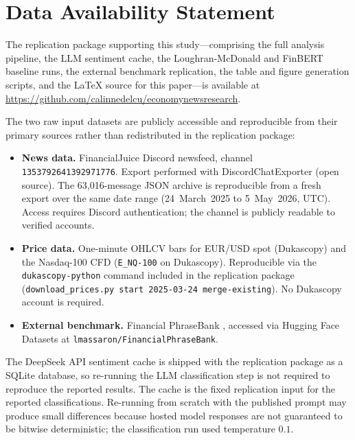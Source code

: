 \section*{Data Availability Statement}

The replication package supporting this study---comprising the full
analysis pipeline, the LLM sentiment cache, the Loughran-McDonald and
FinBERT baseline runs, the external benchmark replication, the table
and figure generation scripts, and the LaTeX source for this paper---is
available at
\url{https://github.com/calinnedelcu/economynewsresearch}.

The two raw input datasets are publicly accessible and reproducible
from their primary sources rather than redistributed in the
replication package:

\begin{itemize}[leftmargin=*, itemsep=2pt]
\item \textbf{News data.} FinancialJuice Discord newsfeed, channel
\texttt{1353792641392971776}. Export performed with
DiscordChatExporter (open source). The 63{,}016-message JSON archive
is reproducible from a fresh export over the same date range
(24~March~2025 to 5~May~2026, UTC). Access requires Discord
authentication; the channel is publicly readable to verified accounts.

\item \textbf{Price data.} One-minute OHLCV bars for EUR/USD spot
(Dukascopy) and the Nasdaq-100 CFD (\texttt{E\_NQ-100} on Dukascopy).
Reproducible via the \texttt{dukascopy-python} command included in
the replication package (\texttt{download\_prices.py
\textendash\textendash start 2025-03-24 \textendash\textendash
merge-existing}). No Dukascopy account is required.

\item \textbf{External benchmark.} Financial PhraseBank
\citep{malo2014good}, accessed via Hugging Face Datasets at
\texttt{lmassaron/FinancialPhraseBank}.
\end{itemize}

The DeepSeek API sentiment cache is shipped with the replication
package as a SQLite database, so re-running the LLM classification
step is not required to reproduce the reported results. The cache is
the fixed replication input for the reported classifications.
Re-running from scratch with the published prompt may produce small
differences because hosted model responses are not guaranteed to be
bitwise deterministic; the classification run used temperature $0.1$.
